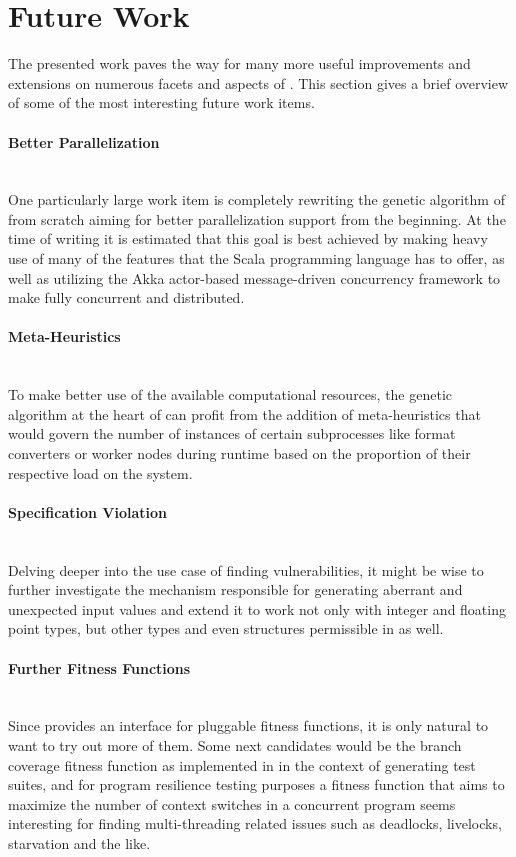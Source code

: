 \section{Future Work}
\label{sec:future}
The presented work paves the way for many more useful improvements and extensions on numerous facets and
aspects of \xmlmate. This section gives a brief overview of some of the most interesting future work items.

\paragraph{Better Parallelization} ~\\
One particularly large work item is completely rewriting the
genetic algorithm of \xmlmate from scratch aiming for better parallelization support from the beginning. At the time of writing it is estimated that this
goal is best achieved by making heavy use of many of the features that the {\small
Scala}\cite{scala-overview-tech-report} programming language has to offer, as well as utilizing the {\small
Akka} actor-based message-driven concurrency framework\cite{Wyatt:2013:AC:2663429} to make \xmlmate fully
concurrent and distributed.
\paragraph{Meta-Heuristics} ~\\
To make better use of the available computational resources, the genetic algorithm at the heart of
\xmlmate can profit from the addition of meta-heuristics that would govern the number of instances of certain
subprocesses like format converters or worker nodes during runtime based on the proportion of their
respective load on the system.
\paragraph{Specification Violation} ~\\
Delving deeper into the use case of finding vulnerabilities, it might be wise to further investigate
the mechanism responsible for generating aberrant and unexpected input values and extend it to work not only
with integer and floating point types, but other types and even structures permissible in \xml as well.
\paragraph{Further Fitness Functions} ~\\
Since \xmlmate provides an interface for pluggable fitness functions, it is only natural to want to try
out more of them. Some next candidates would be the branch coverage fitness function as implemented in
\evosuite in the context of generating test suites, and for program resilience testing purposes a fitness
function that aims to maximize the number of context switches in a concurrent program seems interesting for
finding multi-threading related issues such as deadlocks, livelocks, starvation and the like.
